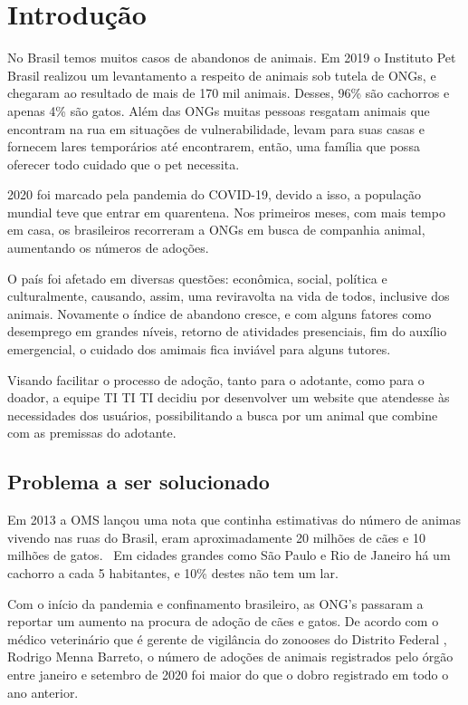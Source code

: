 \chapter[Introdução]{Introdução}
No Brasil temos muitos casos de abandonos de animais. Em 2019 o Instituto Pet Brasil realizou um levantamento a respeito de animais sob tutela de ONGs, e chegaram ao resultado de mais de 170 mil animais. Desses, 96\% são cachorros e apenas 4\% são gatos. Além das ONGs muitas pessoas resgatam animais que encontram na rua em situações de vulnerabilidade, levam para suas casas e fornecem lares temporários até encontrarem, então, uma família que possa oferecer todo cuidado que o pet necessita.

2020 foi marcado pela pandemia do COVID-19, devido a isso, a população mundial teve que entrar em quarentena. Nos primeiros meses, com mais tempo em casa, os brasileiros recorreram a ONGs em busca de companhia animal, aumentando os números de adoções.

O país foi afetado em diversas questões: econômica, social, política e culturalmente, causando, assim, uma reviravolta na vida de todos, inclusive dos animais. Novamente o índice de abandono cresce, e com alguns fatores como desemprego em grandes níveis, retorno de atividades presenciais, fim do auxílio emergencial, o cuidado dos amimais fica inviável para alguns tutores. 

Visando facilitar o processo de adoção, tanto para o adotante, como para o doador, a equipe TI TI TI decidiu por desenvolver um website que atendesse às necessidades dos usuários, possibilitando a busca por um animal que combine com as premissas do adotante.

\section{Problema a ser solucionado}
Em 2013 a OMS lançou uma nota que continha estimativas do número de animas vivendo nas ruas do Brasil, eram aproximadamente 20 milhões de cães e 10 milhões de gatos.  Em cidades grandes como São Paulo e Rio de Janeiro há um cachorro a cada 5 habitantes, e 10\% destes não tem um lar.

Com o início da pandemia e confinamento brasileiro, as ONG's passaram a reportar um aumento na procura de adoção de cães e gatos. De acordo com o médico veterinário que é gerente de vigilância do zonooses do Distrito Federal , Rodrigo Menna Barreto, o número de adoções de animais registrados pelo órgão entre janeiro e setembro de 2020 foi maior do que o dobro registrado em todo o ano anterior.

